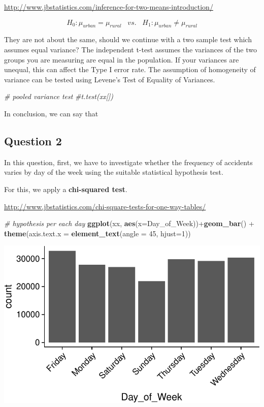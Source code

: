 \documentclass[]{article}
\newenvironment{Shaded}{\begin{snugshade}}{\end{snugshade}}
\newcommand{\KeywordTok}[1]{\textcolor[rgb]{0.13,0.29,0.53}{\textbf{{#1}}}}
\newcommand{\DataTypeTok}[1]{\textcolor[rgb]{0.13,0.29,0.53}{{#1}}}
\newcommand{\DecValTok}[1]{\textcolor[rgb]{0.00,0.00,0.81}{{#1}}}
\newcommand{\StringTok}[1]{\textcolor[rgb]{0.31,0.60,0.02}{{#1}}}
\newcommand{\CommentTok}[1]{\textcolor[rgb]{0.56,0.35,0.01}{\textit{{#1}}}}
\newcommand{\NormalTok}[1]{{#1}}
\begin{document}
\url{http://www.jbstatistics.com/inference-for-two-means-introduction/}

\[H_{0}: \mu_{urban} = \mu_{rural}\;\;\;vs.\;\;\;H_{1}: \mu_{urban} \neq \mu_{rural}\]

They are not about the same, should we continue with a two sample test
which assumes equal variance? The independent t-test assumes the
variances of the two groups you are measuring are equal in the
population. If your variances are unequal, this can affect the Type I
error rate. The assumption of homogeneity of variance can be tested
using Levene's Test of Equality of Variances.

\begin{Shaded}
\begin{Highlighting}[]
\CommentTok{# pooled variance test}
\CommentTok{#t.test(xx[])}
\end{Highlighting}
\end{Shaded}

In conclusion, we can say that

\subsection{Question 2}\label{question-2}

In this question, first, we have to investigate whether the frequency of
accidents varies by day of the week using the suitable statistical
hypothesis test.

For this, we apply a \textbf{chi-squared test}.

\url{http://www.jbstatistics.com/chi-square-tests-for-one-way-tables/}

\begin{Shaded}
\begin{Highlighting}[]
\CommentTok{# hypothesis per each day}
\KeywordTok{ggplot}\NormalTok{(xx, }\KeywordTok{aes}\NormalTok{(}\DataTypeTok{x=}\NormalTok{Day_of_Week))+}\KeywordTok{geom_bar}\NormalTok{() +}
\StringTok{  }\KeywordTok{theme}\NormalTok{(}\DataTypeTok{axis.text.x =} \KeywordTok{element_text}\NormalTok{(}\DataTypeTok{angle =} \DecValTok{45}\NormalTok{, }\DataTypeTok{hjust=}\DecValTok{1}\NormalTok{))}
\end{Highlighting}
\end{Shaded}

\includegraphics{READMEv2_files/figure-latex/unnamed-chunk-13-1.pdf}
\end{document}

